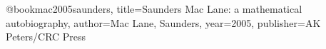 
@book{mac2005saunders,
  title={Saunders Mac Lane: a mathematical autobiography},
  author={Mac Lane, Saunders},
  year={2005},
  publisher={AK Peters/CRC Press}
}
